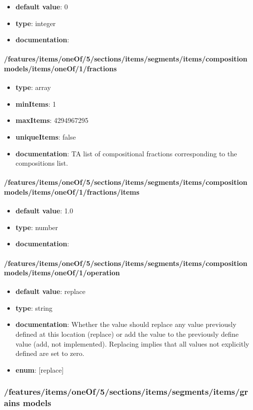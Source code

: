 \begin{itemize}\item {\bf default value}: 0
\item {\bf type}: integer
\item {\bf documentation}: 
\end{itemize}\paragraph{/features/items/oneOf/5/sections/items/segments/items/composition models/items/oneOf/1/fractions}
\begin{itemize}\item {\bf type}: array
\item {\bf minItems}: 1
\item {\bf maxItems}: 4294967295
\item {\bf uniqueItems}: false
\item {\bf documentation}: TA list of compositional fractions corresponding to the compositions list.
\end{itemize}\paragraph{/features/items/oneOf/5/sections/items/segments/items/composition models/items/oneOf/1/fractions/items}
\begin{itemize}\item {\bf default value}: 1.0
\item {\bf type}: number
\item {\bf documentation}: 
\end{itemize}\paragraph{/features/items/oneOf/5/sections/items/segments/items/composition models/items/oneOf/1/operation}
\begin{itemize}\item {\bf default value}: replace
\item {\bf type}: string
\item {\bf documentation}: Whether the value should replace any value previously defined at this location (replace) or add the value to the previously define value (add, not implemented). Replacing implies that all values not explicitly defined are set to zero.
\item {\bf enum}: [replace]\end{itemize}\subsubsection{/features/items/oneOf/5/sections/items/segments/items/grains models}
